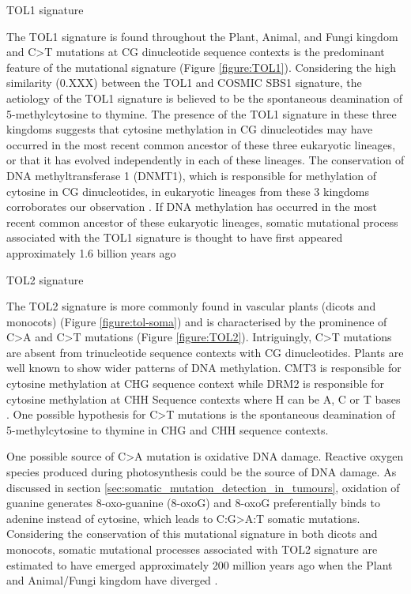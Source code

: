 \begin{description}
    \item[TOL1 signature]
\end{description}

The TOL1 signature is found throughout the Plant, Animal, and Fungi kingdom and C>T mutations at CG dinucleotide sequence contexts is the predominant feature of the mutational signature (Figure \ref{figure:TOL1}). Considering the high similarity (0.XXX) between the TOL1 and COSMIC SBS1 signature, the aetiology of the TOL1 signature is believed to be the spontaneous deamination of 5-methylcytosine to thymine. The presence of the TOL1 signature in these three kingdoms suggests that cytosine methylation in CG dinucleotides may have occurred in the most recent common ancestor of these three eukaryotic lineages, or that it has evolved independently in each of these lineages. The conservation of DNA methyltransferase 1 (DNMT1), which is responsible for methylation of cytosine in CG dinucleotides, in eukaryotic lineages from these 3 kingdoms corroborates our observation \cite{De_Mendoza2019-dy, Mattei2022-fm}. If DNA methylation has occurred in the most recent common ancestor of these eukaryotic lineages, somatic mutational process associated with the TOL1 signature is thought to have first appeared approximately 1.6 billion years ago \cite{Wang1999-vj, Heckman2001-ty}

\begin{description}
    \item[TOL2 signature]
\end{description}

The TOL2 signature is more commonly found in vascular plants (dicots and monocots) (Figure \ref{figure:tol-soma}) and is characterised by the prominence of C>A and C>T mutations (Figure \ref{figure:TOL2}). Intriguingly, C>T mutations are absent from trinucleotide sequence contexts with CG dinucleotides. Plants are well known to show wider patterns of DNA methylation. CMT3 is responsible for cytosine methylation at CHG sequence context while DRM2 is responsible for cytosine methylation at CHH Sequence contexts where H can be A, C or T bases \cite{Finnegan1998-qp}. One possible hypothesis for C>T mutations is the spontaneous deamination of 5-methylcytosine to thymine in CHG and CHH sequence contexts.

One possible source of C>A mutation is oxidative DNA damage. Reactive oxygen species produced during photosynthesis could be the source of DNA damage. As discussed in section \ref{sec:somatic_mutation_detection_in_tumours}, oxidation of guanine generates 8-oxo-guanine (8-oxoG) and 8-oxoG preferentially binds to adenine instead of cytosine, which leads to C:G>A:T somatic mutations. Considering the conservation of this mutational signature in both dicots and monocots, somatic mutational processes associated with TOL2 signature are estimated to have emerged approximately 200 million years ago when the Plant and Animal/Fungi kingdom have diverged \cite{Wolfe1989-pg}. 

